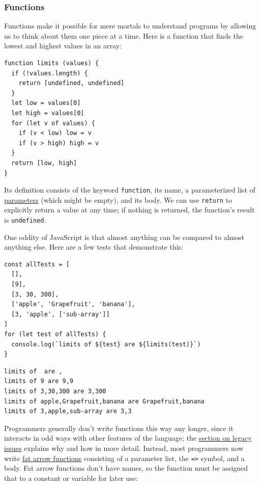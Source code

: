 \subsubsection{Functions}\label{s:basics-functions}

Functions make it possible for mere mortals to understand programs by
allowing us to think about them one piece at a time. Here is a function
that finds the lowest and highest values in an array:

\begin{verbatim}
function limits (values) {
  if (!values.length) {
    return [undefined, undefined]
  }
  let low = values[0]
  let high = values[0]
  for (let v of values) {
    if (v < low) low = v
    if (v > high) high = v
  }
  return [low, high]
}
\end{verbatim}

Its definition consists of the keyword \texttt{function}, its name, a
parameterized list of \protect\hyperlink{g:parameter}{parameters} (which
might be empty), and its body. We can use \texttt{return} to explicitly
return a value at any time; if nothing is returned, the function's
result is \texttt{undefined}.

One oddity of JavaScript is that almost anything can be compared to
almost anything else. Here are a few tests that demonstrate this:

\begin{verbatim}
const allTests = [
  [],
  [9],
  [3, 30, 300],
  ['apple', 'Grapefruit', 'banana'],
  [3, 'apple', ['sub-array']]
]
for (let test of allTests) {
  console.log(`limits of ${test} are ${limits(test)}`)
}
\end{verbatim}

\begin{verbatim}
limits of  are ,
limits of 9 are 9,9
limits of 3,30,300 are 3,300
limits of apple,Grapefruit,banana are Grapefruit,banana
limits of 3,apple,sub-array are 3,3
\end{verbatim}

Programmers generally don't write functions this way any longer, since
it interacts in odd ways with other features of the language; the
\protect\hyperlink{s:legacy-prototypes}{section on legacy issues}
explains why and how in more detail. Instead, most programmers now write
\protect\hyperlink{g:fat-arrow}{fat arrow functions} consisting of a
parameter list, the \texttt{=\textgreater{}} symbol, and a body. Fat
arrow functions don't have names, so the function must be assigned that
to a constant or variable for later use:


